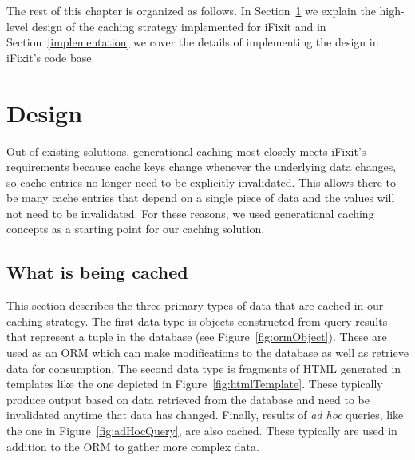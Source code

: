 \documentclass[12pt]{ucthesis}
\begin{document}
The rest of this chapter is organized as follows.
In Section~\ref{design} we explain the high-level design of the caching strategy implemented for \textsf{iFixit} and in Section~\ref{implementation} we cover the details of implementing the design in \textsf{iFixit}'s code base.

\section{Design} \label{design}
Out of existing solutions, generational caching most closely meets \textsf{iFixit}'s requirements because cache keys change whenever the underlying data changes, so cache entries no longer need to be explicitly invalidated.
This allows there to be many cache entries that depend on a single piece of data and the values will not need to be invalidated.
For these reasons, we used generational caching concepts as a starting point for our caching solution.

\subsection{What is being cached}
This section describes the three primary types of data that are cached in our caching strategy.
The first data type is objects constructed from query results that represent a tuple in the database (see Figure~\ref{fig:ormObject}).
These are used as an ORM which can make modifications to the database as well as retrieve data for consumption.
The second data type is fragments of HTML generated in templates like the one depicted in Figure~\ref{fig:htmlTemplate}.
These typically produce output based on data retrieved from the database and need to be invalidated anytime that data has changed.
Finally, results of \textit{ad hoc} queries, like the one in Figure~\ref{fig:adHocQuery}, are also cached.
These typically are used in addition to the ORM to gather more complex data.
\end{document}
